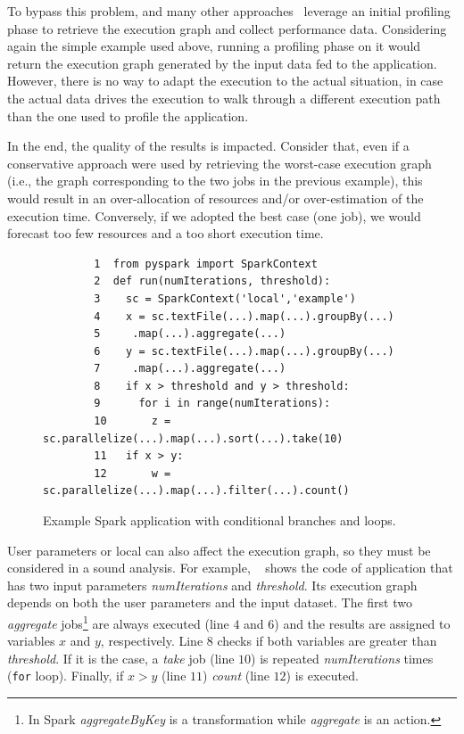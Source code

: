 To bypass this problem, \cSpark and many other approaches~\cite{Sidhanta2016, dSpark} leverage  an initial profiling phase to retrieve the execution graph and collect performance data. Considering again the simple example used above, running a profiling phase on it would return the execution graph generated by the input data fed to the application. However, there is no way to adapt the execution to the actual situation, in case the actual data drives the execution to walk through a different execution path than the one used to profile the application. 

In the end, the  quality of the results is impacted. Consider that, even if a conservative approach were used by retrieving the worst-case execution graph (i.e., the graph corresponding to the two jobs in the previous example), this would result in an over-allocation of resources and/or over-estimation of the execution time. Conversely, if we adopted the best case (one job), we would forecast too few resources and a too short execution time.

\begin{figure}[htbp]
	\begin{small}
		\begin{verbatim}
		1  from pyspark import SparkContext
		2  def run(numIterations, threshold):
		3    sc = SparkContext('local','example')
		4  	 x = sc.textFile(...).map(...).groupBy(...)
		5     .map(...).aggregate(...)
		6    y = sc.textFile(...).map(...).groupBy(...)
		7     .map(...).aggregate(...)
		8    if x > threshold and y > threshold:
		9      for i in range(numIterations):
		10       z = sc.parallelize(...).map(...).sort(...).take(10)
		11   if x > y:
		12       w = sc.parallelize(...).map(...).filter(...).count()
		\end{verbatim}
	\end{small}
	\caption{Example Spark application with conditional branches and loops.}
	\label{fig:xdag2-code}
\end{figure}


User parameters or local can also affect the execution graph, so they must be considered in a sound analysis. For example, ~ shows the code of application that has two input parameters \textit{numIterations} and \textit{threshold}. Its execution graph depends on both the user parameters and the input dataset. The first two \textit{aggregate} jobs\footnote{In Spark \textit{aggregateByKey} is a transformation while \textit{aggregate} is an action.} are always executed (line $4$ and $6$) and the results are assigned to variables $x$ and $y$, respectively. Line $8$ checks if both variables are greater than \textit{threshold}. If it is the case, a \textit{take} job (line $10$) is repeated \textit{numIterations} times (\verb#for# loop). Finally, if $x > y$ (line $11$) \textit{count} (line $12$) is executed. 

